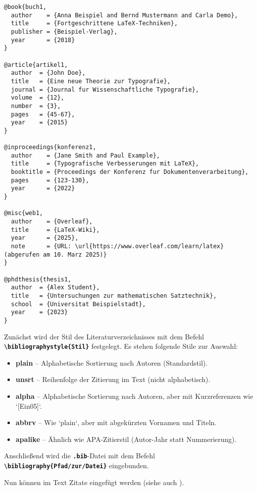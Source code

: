 \begin{lstlisting}[language={[LaTeX]TeX}, caption={Beispiel für eine \texttt{.bib}-Datei}]
@book{buch1,
  author    = {Anna Beispiel and Bernd Mustermann and Carla Demo},
  title     = {Fortgeschrittene LaTeX-Techniken},
  publisher = {Beispiel-Verlag},
  year      = {2018}
}

@article{artikel1,
  author  = {John Doe},
  title   = {Eine neue Theorie zur Typografie},
  journal = {Journal fur Wissenschaftliche Typografie},
  volume  = {12},
  number  = {3},
  pages   = {45-67},
  year    = {2015}
}

@inproceedings{konferenz1,
  author    = {Jane Smith and Paul Example},
  title     = {Typografische Verbesserungen mit LaTeX},
  booktitle = {Proceedings der Konferenz fur Dokumentenverarbeitung},
  pages     = {123-130},
  year      = {2022}
}

@misc{web1,
  author    = {Overleaf},
  title     = {LaTeX-Wiki},
  year      = {2025},
  note      = {URL: \url{https://www.overleaf.com/learn/latex} (abgerufen am 10. Marz 2025)}
}

@phdthesis{thesis1,
  author  = {Alex Student},
  title   = {Untersuchungen zur mathematischen Satztechnik},
  school  = {Universitat Beispielstadt},
  year    = {2023}
}
\end{lstlisting}

Zunächst wird der Stil des Literaturverzeichnisses mit dem Befehl \textbf{\texttt{\textbackslash bibliographystyle\{Stil\}}} festgelegt.
Es stehen folgende Stile zur Auswahl:
\begin{itemize}
    \item \textbf{plain} – Alphabetische Sortierung nach Autoren (Standardstil).
    \item \textbf{unsrt} – Reihenfolge der Zitierung im Text (nicht alphabetisch).
    \item \textbf{alpha} – Alphabetische Sortierung nach Autoren, aber mit Kurzreferenzen wie `[Ein05]`.
    \item \textbf{abbrv} – Wie `plain`, aber mit abgekürzten Vornamen und Titeln.
    \item \textbf{apalike} – Ähnlich wie APA-Zitierstil (Autor-Jahr statt Nummerierung).
\end{itemize}

Anschließend wird die \textbf{\texttt{.bib}}-Datei mit dem Befehl \textbf{\texttt{\textbackslash bibliography\{Pfad/zur/Datei\}}} eingebunden.

Nun können im Text Zitate eingefügt werden (siehe auch ).
